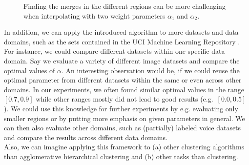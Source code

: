 \begin{figure}[h]
\centering
{}
\caption{Finding the merges in the different regions can be more challenging when interpolating with two weight parameters $\alpha_1$ and $\alpha_2$.}
\label{fig:convexhulls2}
\end{figure}

In addition, we can apply the introduced algorithm to more datasets and data domains, such as the sets contained in the UCI Machine Learning Repository \cite{Dua:2019}. For instance, we could compare different datasets within one specific data domain. Say we evaluate a variety of different image datasets and compare the optimal values of $\alpha$. An interesting observation would be, if we could reuse the optimal parameter from different datasets within the same or even across other domains. In our experiments, we often found similar optimal values in the range $[0.7,0.9]$ while other ranges mostly did not lead to good results (e.g.\ $[0.0, 0.5]$). We could use this knowledge for further experiments by e.g. evaluating only smaller regions or by putting more emphasis on given parameters in general. We can then also evaluate other domains, such as (partially) labeled voice datasets and compare the results across different data domains.\\

Also, we can imagine applying this framework to (a) other clustering algorithms than agglomerative hierarchical clustering and (b) other tasks than clustering.